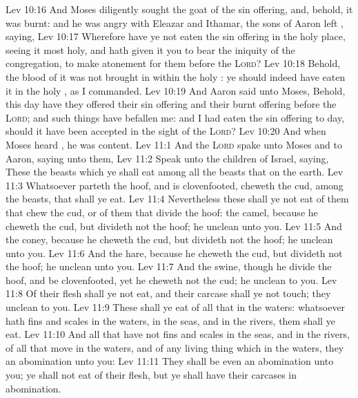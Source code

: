 \vs Lev 10:16 And Moses diligently sought the goat of the sin offering, and, behold, it was burnt: and he was angry with Eleazar and Ithamar, the sons of Aaron  left , saying,
\vs Lev 10:17 Wherefore have ye not eaten the sin offering in the holy place, seeing it  most holy, and  hath given it you to bear the iniquity of the congregation, to make atonement for them before the \textsc{Lord}?
\vs Lev 10:18 Behold, the blood of it was not brought in within the holy : ye should indeed have eaten it in the holy , as I commanded.
\vs Lev 10:19 And Aaron said unto Moses, Behold, this day have they offered their sin offering and their burnt offering before the \textsc{Lord}; and such things have befallen me: and  I had eaten the sin offering to day, should it have been accepted in the sight of the \textsc{Lord}?
\vs Lev 10:20 And when Moses heard , he was content.
\vs Lev 11:1 And the \textsc{Lord} spake unto Moses and to Aaron, saying unto them,
\vs Lev 11:2 Speak unto the children of Israel, saying, These  the beasts which ye shall eat among all the beasts that  on the earth.
\vs Lev 11:3 Whatsoever parteth the hoof, and is clovenfooted,  cheweth the cud, among the beasts, that shall ye eat.
\vs Lev 11:4 Nevertheless these shall ye not eat of them that chew the cud, or of them that divide the hoof:  the camel, because he cheweth the cud, but divideth not the hoof; he  unclean unto you.
\vs Lev 11:5 And the coney, because he cheweth the cud, but divideth not the hoof; he  unclean unto you.
\vs Lev 11:6 And the hare, because he cheweth the cud, but divideth not the hoof; he  unclean unto you.
\vs Lev 11:7 And the swine, though he divide the hoof, and be clovenfooted, yet he cheweth not the cud; he  unclean to you.
\vs Lev 11:8 Of their flesh shall ye not eat, and their carcase shall ye not touch; they  unclean to you.
\vs Lev 11:9 These shall ye eat of all that  in the waters: whatsoever hath fins and scales in the waters, in the seas, and in the rivers, them shall ye eat.
\vs Lev 11:10 And all that have not fins and scales in the seas, and in the rivers, of all that move in the waters, and of any living thing which  in the waters, they  an abomination unto you:
\vs Lev 11:11 They shall be even an abomination unto you; ye shall not eat of their flesh, but ye shall have their carcases in abomination.
